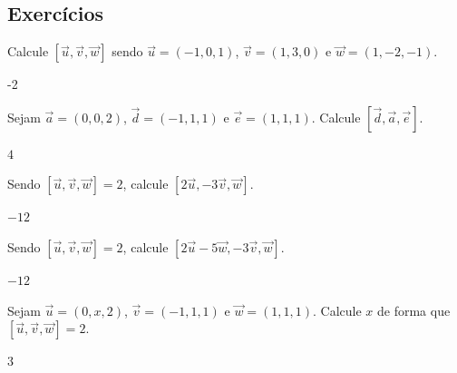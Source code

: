 \subsection{Exercícios}

\begin{exer}
  Calcule $[\vec{u},\vec{v},\vec{w}]$ sendo $\vec{u}=(-1,0,1)$, $\vec{v}=(1,3,0)$ e $\vec{w}=(1,-2,-1)$.
\end{exer}
\begin{resp}
  -2
\end{resp}

\begin{exer}
  Sejam $\vec{a}=(0,0,2)$, $\vec{d}=(-1,1,1)$ e $\vec{e}=(1,1,1)$. Calcule $[\vec{d},\vec{a},\vec{e}]$.
\end{exer}
\begin{resp}
  $4$
\end{resp}

\begin{exer}
  Sendo $[\vec{u},\vec{v},\vec{w}]=2$, calcule $[2\vec{u},-3\vec{v},\vec{w}]$.
\end{exer}
\begin{resp}
  $-12$
\end{resp}

\begin{exer}
  Sendo $[\vec{u},\vec{v},\vec{w}]=2$, calcule $[2\vec{u}-5\vec{w},-3\vec{v},\vec{w}]$.
\end{exer}
\begin{resp}
  $-12$
\end{resp}

\begin{exer}
  Sejam $\vec{u}=(0,x,2)$, $\vec{v}=(-1,1,1)$ e $\vec{w}=(1,1,1)$. Calcule $x$ de forma que $[\vec{u},\vec{v},\vec{w}]=2$.
\end{exer}
\begin{resp}
  $3$
\end{resp}
